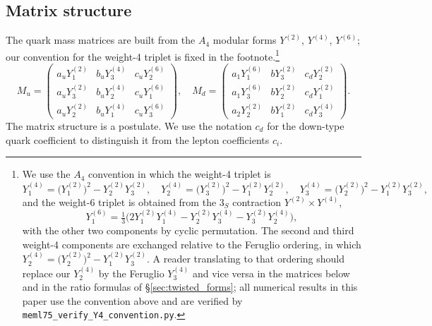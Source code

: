 \documentclass[12pt,a4paper]{article}
\numberwithin{equation}{section}
\begin{document}
\subsection{Matrix structure}
The quark mass matrices are built from the \(A_4\) modular forms
\(Y^{(2)}\), \(Y^{(4)}\), \(Y^{(6)}\); our convention for the
weight-4 triplet is fixed in the footnote.\footnote{We use the
\(A_4\) convention in which the weight-4 triplet is
\begin{equation*}
Y_1^{(4)} = \bigl(Y_1^{(2)}\bigr)^2 - Y_2^{(2)} Y_3^{(2)},\quad
Y_2^{(4)} = \bigl(Y_3^{(2)}\bigr)^2 - Y_1^{(2)} Y_2^{(2)},\quad
Y_3^{(4)} = \bigl(Y_2^{(2)}\bigr)^2 - Y_1^{(2)} Y_3^{(2)},
\end{equation*}
and the weight-6 triplet is obtained from the \(3_S\) contraction
\(Y^{(2)}\times Y^{(4)}\),
\begin{equation*}
Y_1^{(6)} = \tfrac{1}{3}\bigl(2Y_1^{(2)}Y_1^{(4)}
- Y_2^{(2)}Y_3^{(4)} - Y_3^{(2)}Y_2^{(4)}\bigr),
\end{equation*}
with the other two components by cyclic permutation. The second and
third weight-4 components are exchanged relative to the Feruglio
ordering, in which
\(Y_2^{(4)} = \bigl(Y_2^{(2)}\bigr)^2 - Y_1^{(2)} Y_3^{(2)}\).
A reader translating to that ordering should replace our
\(Y_2^{(4)}\) by the Feruglio \(Y_3^{(4)}\) and vice versa in the
matrices below and in the ratio formulas of
\S\ref{sec:twisted_forms}; all numerical results in this paper use
the convention above and are verified by
\texttt{meml75\_verify\_Y4\_convention.py}.}
\begin{equation}
M_u = \begin{pmatrix}
a_u Y_1^{(2)} & b_u Y_3^{(4)} & c_u Y_2^{(6)} \\
a_u Y_3^{(2)} & b_u Y_2^{(4)} & c_u Y_1^{(6)} \\
a_u Y_2^{(2)} & b_u Y_1^{(4)} & c_u Y_3^{(6)}
\end{pmatrix},\quad
M_d = \begin{pmatrix}
a_1 Y_1^{(6)} & b Y_3^{(2)} & c_d Y_2^{(2)} \\
a_1 Y_3^{(6)} & b Y_2^{(2)} & c_d Y_1^{(2)} \\
a_2 Y_2^{(2)} & b Y_1^{(2)} & c_d Y_3^{(4)}
\end{pmatrix}.
\end{equation}
The matrix structure is a postulate. We use the notation \(c_d\) for the
down-type quark coefficient to distinguish it from the lepton
coefficients \(c_i\).
\end{document}
